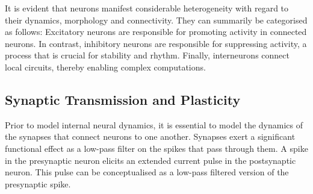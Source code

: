 


\noindent It is evident that neurons manifest considerable heterogeneity with regard to their dynamics, morphology and connectivity. They can summarily be categorised as follows: Excitatory neurons are responsible for promoting activity in connected neurons. In contrast, inhibitory neurons are responsible for suppressing activity, a process that is crucial for stability and rhythm. Finally, interneurons connect local circuits, thereby enabling complex computations.

\subsection[Synaptic Transmission and Plasticity]{Synaptic Transmission and Plasticity}

Prior to model internal neural dynamics, it is essential to model the dynamics of the synapses that connect neurons to one another. Synapses exert a significant functional effect as a low-pass filter on the spikes that pass through them. A spike in the presynaptic neuron elicits an extended current pulse in the postsynaptic neuron. This pulse can be conceptualised as a low-pass filtered version of the presynaptic spike. \\


